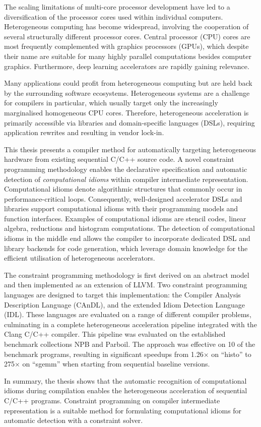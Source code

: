     The scaling limitations of multi-core processor development have led to a
    diversification of the processor cores used within individual computers.
    Heterogeneous computing has become widespread, involving the cooperation of
    several structurally different processor cores.
    Central processor (CPU) cores are most frequently complemented with graphics
    processors (GPUs), which despite their name are suitable for many highly
    parallel computations besides computer graphics.
    Furthermore, deep learning accelerators are rapidly gaining relevance.

    Many applications could profit from heterogeneous computing but are held
    back by the surrounding software ecosystems.
    Heterogeneous systems are a challenge for compilers in particular, which
    usually target only the increasingly marginalised homogeneous CPU cores.
    Therefore, heterogeneous acceleration is primarily accessible via libraries
    and domain-specific languages (DSLs), requiring application rewrites and
    resulting in vendor lock-in.

    This thesis presents a compiler method for automatically targeting
    heterogeneous hardware from existing sequential C/C++ source code.
    A novel constraint programming methodology enables the declarative
    specification and automatic detection of {\em computational idioms} within
    compiler intermediate representation.
    Computational idioms denote algorithmic structures that commonly occur in
    performance-critical loops.
    Consequently, well-designed accelerator DSLs and libraries support
    computational idioms with their programming models and function interfaces.
    Examples of computational idioms are stencil codes, linear algebra,
    reductions and histogram computations.
    The detection of computational idioms in the middle end allows the
    compiler to incorporate dedicated DSL and library backends for code
    generation, which leverage domain knowledge for the efficient
    utilisation of heterogeneous accelerators.

    The constraint programming methodology is first derived on an abstract
    model and then implemented as an extension of LLVM.
    Two constraint programming languages are designed to target this
    implementation:
    the Compiler Analysis Description Language (CAnDL), and the extended
    Idiom Detection Language (IDL).
    These languages are evaluated on a range of different compiler problems,
    culminating in a complete heterogeneous acceleration pipeline integrated
    with the Clang C/C++ compiler.
    This pipeline was evaluated on the established benchmark collections NPB
    and Parboil.
    The approach was effective on 10 of the benchmark programs, resulting in
    significant speedups from 1.26$\times$ on ``histo'' to 275$\times$ on
    ``sgemm'' when starting from sequential baseline versions.

    In summary, the thesis shows that the automatic recognition of
    computational idioms during compilation enables the heterogeneous
    acceleration of sequential C/C++ programs.
    Constraint programming on compiler intermediate representation is a suitable
    method for formulating computational idioms for automatic detection
    with a constraint solver.